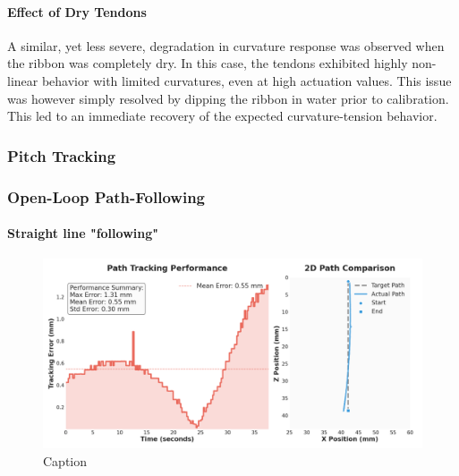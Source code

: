 \paragraph*{Effect of Dry Tendons}
A similar, yet less severe, degradation in curvature response was observed when the ribbon was completely dry. In this case, the tendons exhibited highly non-linear behavior with limited curvatures, even at high actuation values. This issue was however simply resolved by dipping the ribbon in water prior to calibration. This led to an immediate recovery of the expected curvature-tension behavior.



\subsubsection{Pitch Tracking}

\subsubsection{Open-Loop Path-Following}

\paragraph*{Straight line "following"}
\begin{figure} [H]
    \centering
    \includegraphics[width=\linewidth]{images/pathfollowing/openloop/straight_20250704_172708_3.png}
    \caption{Caption}
    \label{fig:enter-label}
\end{figure}

